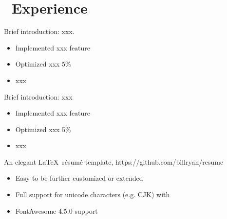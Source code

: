 \documentclass{resume}
\begin{document}
\section{\faUsers\ Experience}
Brief introduction: xxx.
\begin{itemize}
  \item Implemented xxx feature
  \item Optimized xxx 5\%
  \item xxx
\end{itemize}

Brief introduction: xxx
\begin{itemize}
  \item Implemented xxx feature
  \item Optimized xxx 5\%
  \item xxx
\end{itemize}

An elegant \LaTeX\ résumé template, https://github.com/billryan/resume
\begin{itemize}
  \item Easy to be further customized or extended
  \item Full support for unicode characters (e.g. CJK) with \XeLaTeX\
  \item FontAwesome 4.5.0 support
\end{itemize}


\end{document}

